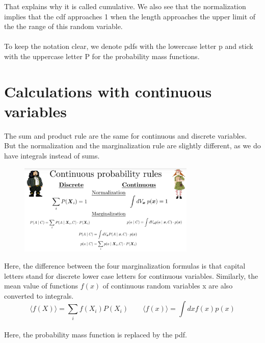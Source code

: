 \documentclass[12pt, a4paper]{scrartcl}
\begin{document}
That explains why it is called cumulative. We also see that the normalization
implies that the cdf approaches 1 when the length approaches the upper
limit of the the range of this random variable.\\

\\

To keep the notation clear, we denote pdfs with the lowercase letter p and
stick with the uppercase letter P for the probability mass functions.\\

\section*{Calculations with continuous variables}
The sum and product rule are the same for continuous and discrete variables.
But the normalization and the marginalization rule are slightly diﬀerent, as we do have integrals instead of sums. %
 \begin{figure}[H]
	\centering
	\includegraphics[width=0.75\textwidth]{8_1.png}
\end{figure}
Here, the diﬀerence between the four marginalization formulas is that capital letters stand for discrete lower case letters for continuous variables. Similarly, the mean value of functions $f(x)$ of continuous random variables x are also converted to integrals. \\
\begin{equation*}\boxed{\langle f(X)\rangle = \sum_i f(X_i)P(X_i)\qquad \langle f(x)\rangle = \int dx f(x)p(x)
}\end{equation*}\\
Here, the probability mass function is replaced by the pdf.\\
\end{document}
